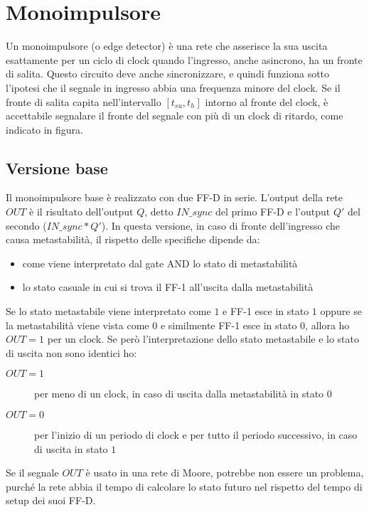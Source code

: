 \documentclass{article}
\begin{document}
\section{Monoimpulsore}

Un monoimpulsore (o edge detector) è una rete che asserisce la sua uscita esattamente per un ciclo di clock quando l'ingresso, anche asincrono, ha un fronte di salita.
Questo circuito deve anche sincronizzare, e quindi funziona sotto l'ipotesi che il segnale in ingresso abbia una frequenza minore del clock.
Se il fronte di salita capita nell'intervallo $[t_{su}, t_h]$ intorno al fronte del clock, è accettabile segnalare il fronte del segnale con più di un clock di ritardo, come indicato in figura.

\subsection{Versione base}

Il monoimpulsore base è realizzato con due FF-D in serie.
L'output della rete $OUT$ è il risultato dell'output $Q$, detto $IN\_sync$ del primo FF-D e l'output $Q'$ del secondo ($IN\_sync * Q'$).
In questa versione, in caso di fronte dell'ingresso che causa metastabilità, il rispetto delle specifiche dipende da:

\begin{itemize}
    \item come viene interpretato dal gate AND lo stato di metastabilità
    \item lo stato casuale in cui si trova il FF-1 all'uscita dalla metastabilità
\end{itemize}

\noindent
Se lo stato metastabile viene interpretato come $1$ e FF-1 esce in stato $1$ oppure se la metastabilità viene vista come $0$ e similmente FF-1 esce in stato $0$, allora ho $OUT=1$ per un clock.
Se però l'interpretazione dello stato metastabile e lo stato di uscita non sono identici ho:

\begin{description}
\item[$OUT=1$] per meno di un clock, in caso di uscita dalla metastabilità in stato $0$
\item[$OUT=0$] per l'inizio di un periodo di clock e per tutto il periodo successivo, in caso di uscita in stato $1$
\end{description}

\noindent
Se il segnale $OUT$ è usato in una rete di Moore, potrebbe non essere un problema, purché la rete abbia il tempo di calcolare lo stato futuro nel rispetto del tempo di setup dei suoi FF-D.
\end{document}
